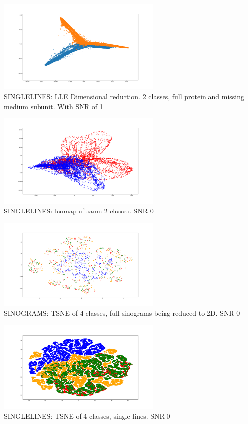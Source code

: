 \documentclass[t, 11pt]{beamer}
\begin{document}
\small
\includegraphics[width=0.60\textwidth]{../LLE_400_mixed_snr1.png} \\
SINGLELINES: LLE Dimensional reduction. 2 classes, full protein and missing medium subunit. With SNR of 1

\includegraphics[width=0.60\textwidth]{../Isomap_200_mixed_snr0.png} \\
SINGLELINES: Isomap of same 2 classes. SNR 0

\includegraphics[width=0.60\textwidth]{../1000_TSNE_4classes_full_sinograms.png} \\
SINOGRAMS: TSNE of 4 classes, full sinograms being reduced to 2D. SNR 0

\includegraphics[width=0.60\textwidth]{../1000_TSNE_4classes.png} \\
SINGLELINES: TSNE of 4 classes, single lines. SNR 0
\end{document}

